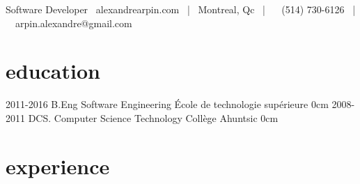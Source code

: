 \documentclass[]{friggeri-cv}
\begin{document}
       {Software Developer}
       {\faCloud ~alexandrearpin.com~ | \faHome ~Montreal, Qc~ | ~ \faPhone ~(514) 730-6126~ | ~\faEnvelopeAlt  ~arpin.alexandre@gmail.com}

\section{education}

\begin{entrylist}
  \entry
    {2011-2016}
    {B.Eng {\normalfont Software Engineering}}
    {École de technologie supérieure}
    {}
    {0cm}
  \entry
    {2008-2011}
    {DCS. {\normalfont Computer Science Technology}}
    {Collège Ahuntsic}
    {}
    {0cm}
\end{entrylist}

\section{experience}
\end{document}
